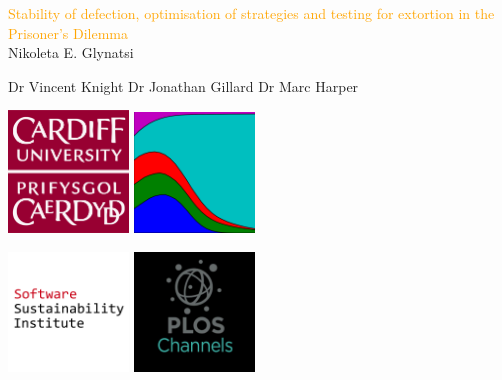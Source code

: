 \documentclass{beamer}
\begin{document}
\begin{frame}
    \begin{center}
        \Large{\textcolor{orange}{Stability of defection, optimisation of
        strategies and testing for extortion in the Prisoner's Dilemma}} \\

        \vspace{1.5cm}
        \normalsize{Nikoleta E. Glynatsi}

        \vspace{1cm}
        \small{Dr Vincent Knight} \hspace{4mm} \small{Dr Jonathan Gillard} \hspace{4mm} \small{Dr Marc Harper}

    \end{center}
\end{frame}

\begin{frame}
    \begin{center}
    \includegraphics[width=0.24\textwidth]{static/cardiff_uni_logo.jpg}\hspace{10pt}
    \includegraphics[width=0.24\textwidth]{static/axelrod-logo.png}\vspace{10pt}

    \includegraphics[width=0.24\textwidth]{static/ssi-logo.png} \hspace{6pt}
    \includegraphics[width=0.24\textwidth]{static/plos-logo.jpg}

    \end{center}
\end{frame}
\end{document}
